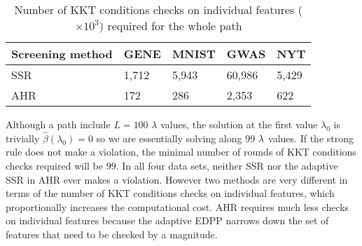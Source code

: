 \begin{table}[H]
\centering
\begin{tabular}{lllll}
\toprule
Screening method & GENE & MNIST & GWAS & NYT \\
\midrule
SSR & 1,712 & 5,943 & 60,986 & 5,429 \\
AHR & 172 & 286 & 2,353 & 622 \\
\bottomrule
\end{tabular}
\caption{Number of KKT conditions checks on individual features ($\times10^3$) required for the whole path}
\label{Tab:kkt2}
\end{table}

Although a path include $L=100$ $\lambda$ values, the solution at the first value $\lambda_{0}$ is trivially $\hat{\beta}(\lambda_0)=0$ so we are essentially solving along $99$ $\lambda$ values. If the strong rule does not make a violation, the minimal number of rounds of KKT conditions checks required will be $99$. In all four data sets, neither SSR nor the adaptive SSR in AHR ever makes a violation. However two methods are very different in terms of the number of KKT conditions checks on individual features, which proportionally increases the computational cost. AHR requires much less checks on individual features because the adaptive EDPP narrows down the set of features that need to be checked by a magnitude.